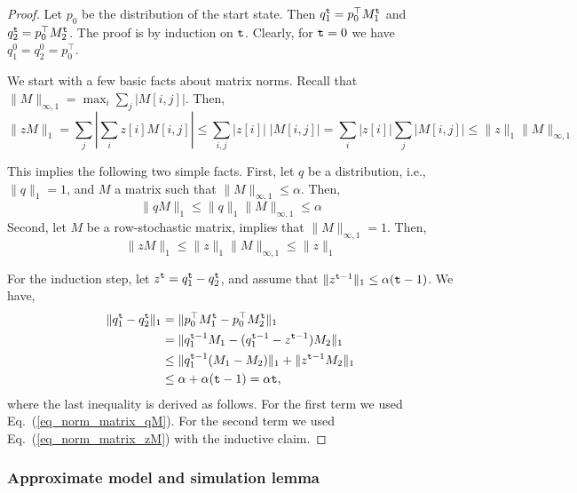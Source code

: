 \begin{proof}
Let $p_0$ be the distribution of the start state. Then
$q_1^{\tt t}=p_0^\top M_1^{\tt t}$ and $q_2^{\tt t}=p_0^\top
M_2^{\tt t}$. The proof is by induction on ${\tt t}$. Clearly, for
${\tt t}=0$ we have $q_1^0=q_2^0=p_0^\top$.

We start with a few basic facts about matrix norms. Recall that
$\|M\|_{\infty,1} = \max_i \sum_j |M[i,j]|$. Then,
\begin{equation}
\label{eq_norm_matrix_1}
%
\| z M\|_1 = \sum_j | \sum_i z[i] M[i,j]|\leq \sum_{i,j} |z[i]|\;
|M[i,j] | = \sum_i |z[i]| \sum_j  |M[i,j]| \leq \|z\|_1
\|M\|_{\infty,1}
\end{equation}

This implies the following two simple facts. First, let $q$ be a
distribution, i.e., $\|q\|_1=1$, and $M$ a matrix such that
$\|M\|_{\infty,1} \leq \alpha $. Then,
\begin{equation}
\label{eq_norm_matrix_qM} \|qM\|_1 \leq \|q\|_1 \|M\|_{\infty,1}
 \leq \alpha
\end{equation}
Second, let $M$ be a row-stochastic matrix,  implies that
$\|M\|_{\infty,1}=1$. Then,
\begin{equation}
\label{eq_norm_matrix_zM} \|zM\|_1 \leq \|z\|_1 \|M\|_{\infty,1}
\leq \|z\|_1
\end{equation}

For the induction step, let $z^{\tt t}=q_1^{\tt t}-q_2^{\tt t}$, and assume that 
$\|z^{{\tt t}-1}\|_1 \leq \alpha ({\tt t}-1)$. We
have,
\begin{align*}
\|q_1^{\tt t}-q_2^{\tt t}\|_1 &= \|p_0^\top M_1^{\tt t}-p_0^\top M_2^{\tt t}\|_1\\
&= \|q_1^{{\tt t}-1}M_1 - (q_1^{{\tt t}-1}-z^{{\tt t}-1})M_2\|_1\\
&\leq \|q_1^{{\tt t}-1} (M_1-M_2)\|_1 + \|z^{{\tt t}-1}M_2\|_1\\
&\leq \alpha + \alpha ({\tt t}-1) = \alpha{\tt t},
\end{align*}
where the last inequality is derived as follows. For the first
term we used Eq.~(\ref{eq_norm_matrix_qM}). For the second term we
used Eq.~(\ref{eq_norm_matrix_zM}) with the inductive claim.
\end{proof}

\subsubsection{Approximate model and simulation lemma}

